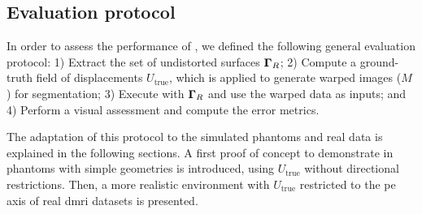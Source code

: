 \subsection{Evaluation protocol}\label{sec:evaluation_protocol}
In order to assess the performance of \regseg{}, we defined the following general
  evaluation protocol:
1) Extract the set of undistorted surfaces $\boldsymbol{\Gamma}_R$;
2) Compute a ground-truth field of displacements $U_\text{true}$, which is applied to
  generate warped images ($M$) for segmentation;
3) Execute \regseg{} with $\boldsymbol{\Gamma}_R$ and use the warped data as inputs; and
4) Perform a visual assessment and compute the error metrics.

The adaptation of this protocol to the simulated phantoms and real data is explained in the
  following sections.
A first proof of concept to demonstrate \regseg{} in phantoms with simple
  geometries is introduced, using $U_\text{true}$ without directional restrictions.
Then, a more realistic environment with $U_\text{true}$ restricted to the
  \gls*{pe} axis of real \gls*{dmri} datasets is presented.

